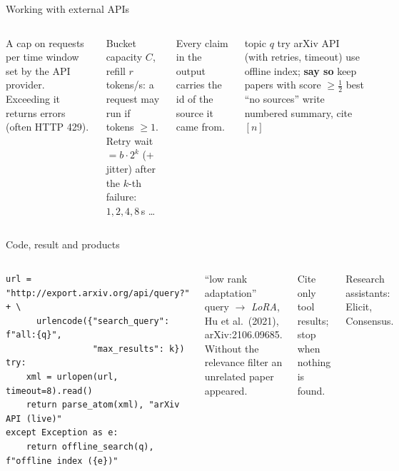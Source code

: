 \documentclass[aspectratio=169,11pt]{beamer}
\begin{document}
\begin{frame}{Working with external APIs}
\begin{columns}[T]
\begin{bdef}
A cap on requests per time window set by the API provider. Exceeding it returns errors (often HTTP 429).
\end{bdef}
\begin{bmath}
Bucket capacity $C$, refill $r$ tokens/s: a request may run if tokens $\ge1$.\\[2pt]
Retry wait $=b\cdot2^{k}$ (+ jitter) after the $k$-th failure: $1, 2, 4, 8$\,s \ldots
\end{bmath}
\begin{bdef}
Every claim in the output carries the id of the source it came from.
\end{bdef}
\begin{balgo}[ScholarAgent]
\begin{algorithmic}[1]
\Require topic $q$
\State try arXiv API (with retries, timeout)
  \State use offline index; \textbf{say so}
\EndIf
\State keep papers with score $\ge\frac12$ best
 \State \Return ``no sources'' \EndIf
\State write numbered summary, cite $[n]$
\end{algorithmic}
\end{balgo}
\end{columns}
\end{frame}

\begin{frame}[fragile]{Code, result and products}
\begin{columns}[T]
\begin{bcode}
\begin{lstlisting}
url = "http://export.arxiv.org/api/query?" + \
      urlencode({"search_query": f"all:{q}",
                 "max_results": k})
try:
    xml = urlopen(url, timeout=8).read()
    return parse_atom(xml), "arXiv API (live)"
except Exception as e:
    return offline_search(q), f"offline index ({e})"
\end{lstlisting}
\end{bcode}
\begin{bres}
``low rank adaptation'' query $\rightarrow$ \emph{LoRA}, Hu et al.\ (2021), arXiv:2106.09685. Without the relevance filter an unrelated paper appeared.
\end{bres}
\begin{bwarn}
Cite only tool results; stop when nothing is found.
\end{bwarn}
\begin{bapp}
Research assistants: Elicit, Consensus.
\end{bapp}
\end{columns}
\end{frame}
\end{document}
